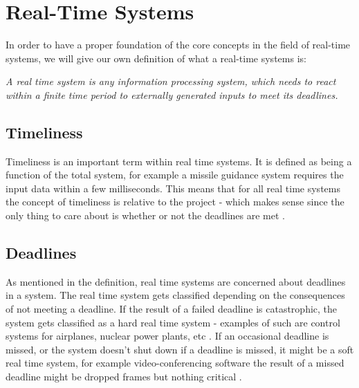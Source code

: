 \section{Real-Time Systems}
In order to have a proper foundation of the core concepts in the field of
real-time systems, we will give our own definition of what a real-time systems
is:

\begin{center}
\begin{minipage}{0.8\linewidth}
\textit{A real time system is any information processing system, which needs to
react within a finite time period to externally generated inputs to meet its
deadlines.}
\end{minipage}
\end{center}





\subsection{Timeliness}
Timeliness is an important term within real time systems. It is defined as being
a function of the total system, for example a missile guidance system requires
the input data within a few milliseconds. This means that for all real time
systems the concept of timeliness is relative to the project - which makes sense since the only thing
to care about is whether or not the deadlines are met \Source.

\subsection{Deadlines}
As mentioned in the definition, real time systems are concerned about
deadlines in a system.
The real time system gets classified depending on the consequences of not
meeting a deadline. If the result of a failed deadline is catastrophic, the
system gets classified as a hard real time system - examples of such are control
systems for airplanes, nuclear power plants, etc \Source.
If an occasional deadline is missed, or the system doesn't shut down if a
deadline is missed, it might be a soft real time system, for example
video-conferencing software the result of a missed deadline might be dropped
frames but nothing critical \Source.

